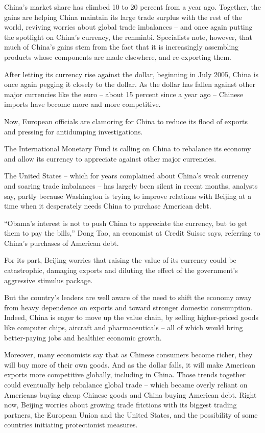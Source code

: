 ﻿\documentclass[12pt]{article}
\begin{document}
China's market share has climbed 10 to 20 percent from a year ago. Together, the gains are helping
China maintain its large trade surplus with the rest of the world, reviving worries about global
trade imbalances -- and once again putting the spotlight on China's currency, the renminbi.
Specialists note, however, that much of China's gains stem from the fact that it is increasingly
assembling products whose components are made elsewhere, and re-exporting them.

After letting its currency rise against the dollar, beginning in July 2005, China is once again
pegging it closely to the dollar. As the dollar has fallen against other major currencies like the
euro -- about 15 percent since a year ago -- Chinese imports have become more and more competitive.

Now, European officials are clamoring for China to reduce its flood of exports and pressing for
antidumping investigations.

The International Monetary Fund is calling on China to rebalance its economy and allow its currency
to appreciate against other major currencies.

The United States -- which for years complained about China's weak currency and soaring trade
imbalances -- has largely been silent in recent months, analysts say, partly because Washington is
trying to improve relations with Beijing at a time when it desperately needs China to purchase
American debt.

``Obama's interest is not to push China to appreciate the currency, but to get them to pay the
bills,'' Dong Tao, an economist at Credit Suisse says, referring to China's purchases of American
debt.

For its part, Beijing worries that raising the value of its currency could be catastrophic, damaging
exports and diluting the effect of the government's aggressive stimulus package.

But the country's leaders are well aware of the need to shift the economy away from heavy dependence
on exports and toward stronger domestic consumption. Indeed, China is eager to move up the value
chain, by selling higher-priced goods like computer chips, aircraft and pharmaceuticals -- all of
which would bring better-paying jobs and healthier economic growth.

Moreover, many economists say that as Chinese consumers become richer, they will buy more of their
own goods. And as the dollar falls, it will make American exports more competitive globally,
including in China. Those trends together could eventually help rebalance global trade -- which
became overly reliant on Americans buying cheap Chinese goods and China buying American debt. Right
now, Beijing worries about growing trade frictions with its biggest trading partners, the European
Union and the United States, and the possibility of some countries initiating protectionist
measures.
\end{document}
